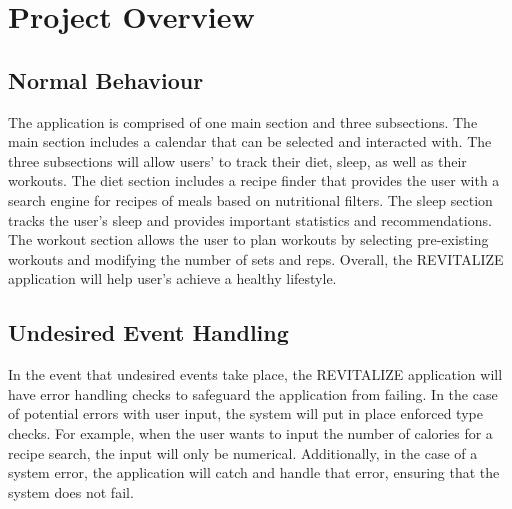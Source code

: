 \documentclass[12pt, titlepage]{article}
\begin{document}
	
	\section{Project Overview}
	
	\subsection{Normal Behaviour}
	The application is comprised of one main section and three subsections. The main section includes a calendar that can be selected and interacted with. The three subsections will allow users' to track their diet, sleep, as well as their workouts. The diet section includes a recipe finder that provides the user with a search engine for recipes of meals based on nutritional filters. The sleep section tracks the user's sleep and provides important statistics and recommendations. The workout section allows the user to plan workouts by selecting pre-existing workouts and modifying the number of sets and reps. Overall, the REVITALIZE application will help user's achieve a healthy lifestyle.

	\subsection{Undesired Event Handling}
	
    In the event that undesired events take place, the REVITALIZE application will have error handling checks to safeguard the application from failing. In the case of potential errors with user input, the system will put in place enforced type checks. For example, when the user wants to input the number of calories for a recipe search, the input will only be numerical. Additionally, in the case of a system error, the application will catch and handle that error, ensuring that the system does not fail. 
\end{document}
